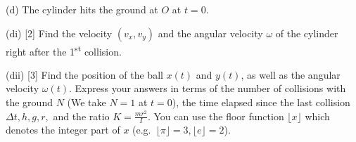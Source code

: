 (d) The cylinder hits the ground at $O$ at $t = 0$.

(di) [2] Find the velocity $(v_x, v_y)$ and the angular velocity $\omega$ of
the cylinder right after the 1\textsuperscript{st} collision.

(dii) [3] Find the position of the ball $x(t)$ and $y(t)$, as well as the
angular velocity $\omega(t)$. Express your answers in terms of the number of
collisions with the ground $N$ (We take $N = 1$ at $t = 0$), the time elapsed
since the last collision $\Delta t, h, g, r,$ and the ratio
$K = \frac{mr^2}{I}$. You can use the floor function $\lfloor x \rfloor$ which
denotes the integer part of $x$ (e.g.\ $\lfloor \pi \rfloor = 3, \lfloor e
\rfloor = 2$).
